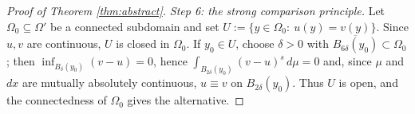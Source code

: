 \documentclass[10pt,a4paper]{amsart}
\begin{document}
\begin{proof}[Proof of Theorem \ref{thm:abstract}]
\emph{Step 6: the strong comparison principle.} Let $\Omega_0\subseteq\Omega'$ be a connected
subdomain and set $U:=\{y\in\Omega_0:\ u(y)=v(y)\}$. Since $u,v$ are continuous, $U$ is closed in
$\Omega_0$. If $y_0\in U$, choose $\delta>0$ with $\overline{B_{6\delta}(y_0)}\subset\Omega_0$; then
$\inf_{B_{\delta}(y_0)}(v-u)=0$, hence $\int_{B_{2\delta}(y_0)}(v-u)^s\,d\mu=0$ and, since $\mu$ and $dx$
are mutually absolutely continuous, $u\equiv v$ on $B_{2\delta}(y_0)$. Thus $U$ is open, and the
connectedness of $\Omega_0$ gives the alternative.
\end{proof}
\end{document}
